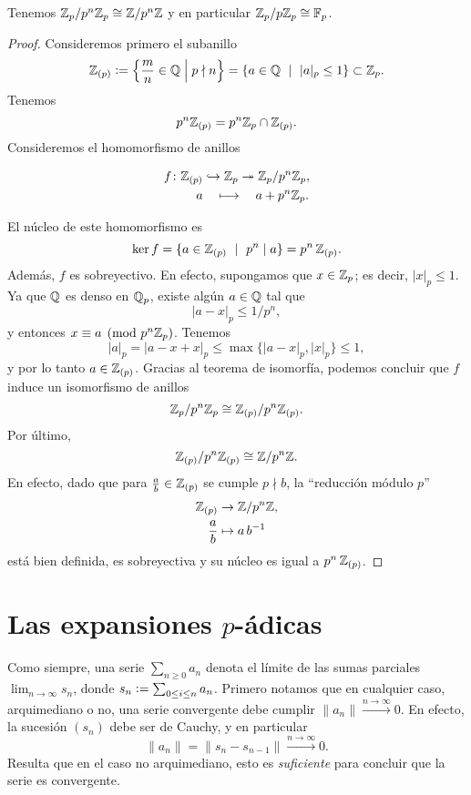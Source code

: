 \documentclass{article}
\numberwithin{equation}{section}
\theoremstyle{definition}
\begin{document}
\begin{proposicion}
  Tenemos $\mathbb{Z}_p/p^n\mathbb{Z}_p\cong \mathbb{Z}/p^n\mathbb{Z}$ y en particular
  $\mathbb{Z}_p/p\mathbb{Z}_p\cong \mathbb{F}_p$.

  \begin{proof}
    Consideremos primero el subanillo
    \[ \mathbb{Z}_{(p)} \mathrel{\mathop:}= \Bigl\{ \frac{m}{n} \in \mathbb{Q} \Bigm| p\nmid n \Bigr\} =
       \{ a \in \mathbb{Q} ~\mid~ |a|_p \le 1 \} \subset \mathbb{Z}_p. \]
    Tenemos
    $$p^n\mathbb{Z}_{(p)} = p^n\mathbb{Z}_p \cap \mathbb{Z}_{(p)}.$$
    Consideremos el homomorfismo de anillos

    \begin{align*}
      f\colon \mathbb{Z}_{(p)} & \hookrightarrow \mathbb{Z}_p \twoheadrightarrow \mathbb{Z}_p/p^n\mathbb{Z}_p,\\
      a & \quad\longmapsto\quad a + p^n\mathbb{Z}_p.
    \end{align*}

    El núcleo de este homomorfismo es
    $$\ker f = \{ a \in \mathbb{Z}_{(p)} ~\mid~ p^n\mid a \} = p^n\,\mathbb{Z}_{(p)}.$$
    Además, $f$ es sobreyectivo. En efecto, supongamos que $x \in \mathbb{Z}_p$;
    es decir, $|x|_p \le 1$. Ya que $\mathbb{Q}$ es denso en $\mathbb{Q}_p$, existe algún
    $a \in \mathbb{Q}$ tal que
    $$|a-x|_p \le 1/p^n,$$
    y entonces $x \equiv a \pmod{p^n\mathbb{Z}_p}$. Tenemos
    $$|a|_p = |a - x + x|_p \le \max \{ |a-x|_p, |x|_p \} \le 1,$$
    y por lo tanto $a \in \mathbb{Z}_{(p)}$. Gracias al teorema de isomorfía, podemos
    concluir que $f$ induce un isomorfismo de anillos
    $$\mathbb{Z}_p/p^n\mathbb{Z}_p \cong \mathbb{Z}_{(p)}/p^n\mathbb{Z}_{(p)}.$$
    Por último,
    $$\mathbb{Z}_{(p)}/p^n\mathbb{Z}_{(p)} \cong \mathbb{Z}/p^n\mathbb{Z}.$$
    En efecto, dado que para $\frac{a}{b}\in \mathbb{Z}_{(p)}$ se cumple $p\nmid b$,
    la ``reducción módulo $p$''
    \begin{align*}
      \mathbb{Z}_{(p)} & \to \mathbb{Z}/p^n\mathbb{Z},\\
      \frac{a}{b} & \mapsto a\,b^{-1}
    \end{align*}
    está bien definida, es sobreyectiva y su núcleo es igual a $p^n\,\mathbb{Z}_{(p)}$.
  \end{proof}
\end{proposicion}


\section{Las expansiones $p$-ádicas}

Como siempre, una serie $\sum_{n\ge 0} a_n$ denota el límite de las sumas
parciales $\lim_{n\to \infty} s_n$, donde
$s_n \mathrel{\mathop:}= \sum_{0 \le i \le n} a_n$. Primero notamos que en cualquier caso,
arquimediano o no, una serie convergente debe cumplir
$\|a_n\| \xrightarrow{n \to \infty} 0$. En efecto, la sucesión $(s_n)$ debe ser
de Cauchy, y en particular
$$\|a_n\| = \|s_n - s_{n-1}\| \xrightarrow{n \to \infty} 0.$$
Resulta que en el caso no arquimediano, esto es \emph{suficiente} para concluir
que la serie es convergente.
\end{document}
